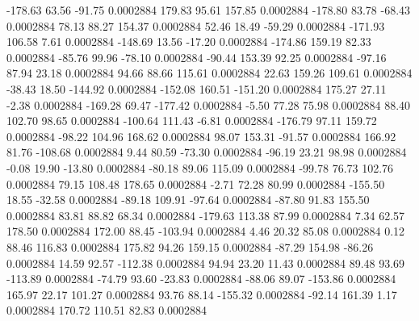      -178.63       63.56      -91.75     0.0002884
      179.83       95.61      157.85     0.0002884
     -178.80       83.78      -68.43     0.0002884
       78.13       88.27      154.37     0.0002884
       52.46       18.49      -59.29     0.0002884
     -171.93      106.58        7.61     0.0002884
     -148.69       13.56      -17.20     0.0002884
     -174.86      159.19       82.33     0.0002884
      -85.76       99.96      -78.10     0.0002884
      -90.44      153.39       92.25     0.0002884
      -97.16       87.94       23.18     0.0002884
       94.66       88.66      115.61     0.0002884
       22.63      159.26      109.61     0.0002884
      -38.43       18.50     -144.92     0.0002884
     -152.08      160.51     -151.20     0.0002884
      175.27       27.11       -2.38     0.0002884
     -169.28       69.47     -177.42     0.0002884
       -5.50       77.28       75.98     0.0002884
       88.40      102.70       98.65     0.0002884
     -100.64      111.43       -6.81     0.0002884
     -176.79       97.11      159.72     0.0002884
      -98.22      104.96      168.62     0.0002884
       98.07      153.31      -91.57     0.0002884
      166.92       81.76     -108.68     0.0002884
        9.44       80.59      -73.30     0.0002884
      -96.19       23.21       98.98     0.0002884
       -0.08       19.90      -13.80     0.0002884
      -80.18       89.06      115.09     0.0002884
      -99.78       76.73      102.76     0.0002884
       79.15      108.48      178.65     0.0002884
       -2.71       72.28       80.99     0.0002884
     -155.50       18.55      -32.58     0.0002884
      -89.18      109.91      -97.64     0.0002884
      -87.80       91.83      155.50     0.0002884
       83.81       88.82       68.34     0.0002884
     -179.63      113.38       87.99     0.0002884
        7.34       62.57      178.50     0.0002884
      172.00       88.45     -103.94     0.0002884
        4.46       20.32       85.08     0.0002884
        0.12       88.46      116.83     0.0002884
      175.82       94.26      159.15     0.0002884
      -87.29      154.98      -86.26     0.0002884
       14.59       92.57     -112.38     0.0002884
       94.94       23.20       11.43     0.0002884
       89.48       93.69     -113.89     0.0002884
      -74.79       93.60      -23.83     0.0002884
      -88.06       89.07     -153.86     0.0002884
      165.97       22.17      101.27     0.0002884
       93.76       88.14     -155.32     0.0002884
      -92.14      161.39        1.17     0.0002884
      170.72      110.51       82.83     0.0002884
